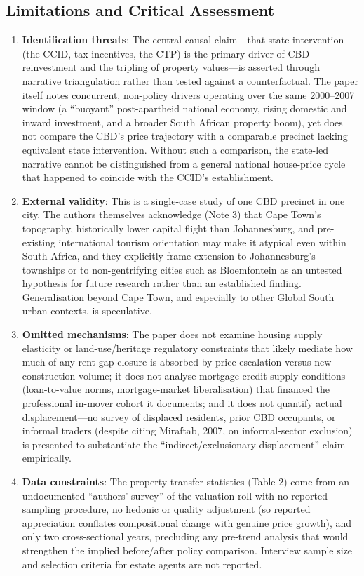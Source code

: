 \subsection*{Limitations and Critical Assessment}

\begin{enumerate}
  \item \textbf{Identification threats}: The central causal claim---that state intervention (the CCID, tax incentives, the CTP) is the primary driver of CBD reinvestment and the tripling of property values---is asserted through narrative triangulation rather than tested against a counterfactual. The paper itself notes concurrent, non-policy drivers operating over the same 2000--2007 window (a ``buoyant'' post-apartheid national economy, rising domestic and inward investment, and a broader South African property boom), yet does not compare the CBD's price trajectory with a comparable precinct lacking equivalent state intervention. Without such a comparison, the state-led narrative cannot be distinguished from a general national house-price cycle that happened to coincide with the CCID's establishment.
  \item \textbf{External validity}: This is a single-case study of one CBD precinct in one city. The authors themselves acknowledge (Note 3) that Cape Town's topography, historically lower capital flight than Johannesburg, and pre-existing international tourism orientation may make it atypical even within South Africa, and they explicitly frame extension to Johannesburg's townships or to non-gentrifying cities such as Bloemfontein as an untested hypothesis for future research rather than an established finding. Generalisation beyond Cape Town, and especially to other Global South urban contexts, is speculative.
  \item \textbf{Omitted mechanisms}: The paper does not examine housing supply elasticity or land-use/heritage regulatory constraints that likely mediate how much of any rent-gap closure is absorbed by price escalation versus new construction volume; it does not analyse mortgage-credit supply conditions (loan-to-value norms, mortgage-market liberalisation) that financed the professional in-mover cohort it documents; and it does not quantify actual displacement---no survey of displaced residents, prior CBD occupants, or informal traders (despite citing Miraftab, 2007, on informal-sector exclusion) is presented to substantiate the ``indirect/exclusionary displacement'' claim empirically.
  \item \textbf{Data constraints}: The property-transfer statistics (Table 2) come from an undocumented ``authors' survey'' of the valuation roll with no reported sampling procedure, no hedonic or quality adjustment (so reported appreciation conflates compositional change with genuine price growth), and only two cross-sectional years, precluding any pre-trend analysis that would strengthen the implied before/after policy comparison. Interview sample size and selection criteria for estate agents are not reported.

\end{enumerate}
